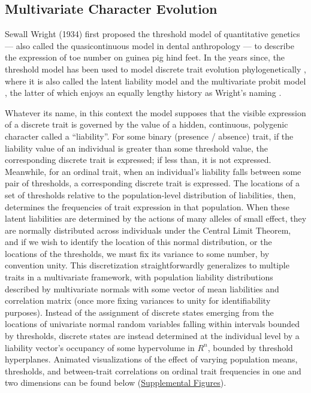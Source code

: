 \documentclass[10pt, twocolumn, twoside]{article}
\begin{document}
\subsection{Multivariate Character Evolution}

Sewall Wright (1934) first proposed the threshold model of quantitative genetics --- also called the quasicontinuous model \citep{grunebergGeneticalStudiesSkeleton1955} in dental anthropology --- to describe the expression of toe number on guinea pig hind feet. In the years since, the threshold model has been used to model discrete trait evolution phylogenetically \citep{felsensteinUsingQuantitativeGenetic2005, felsensteinComparativeMethodBoth2012, revellAncestralCharacterEstimation2014a}, where it is also called the latent liability model \citep{cybisAssessingPhenotypicCorrelation2015} and the multivariate probit model \citep{zhangLargescaleInferenceCorrelation2019}, the latter of which enjoys an equally lengthy history as Wright's naming \citep{blissMethodProbits1934, chibAnalysisMultivariateProbit1998}. 

Whatever its name, in this context the model supposes that the visible expression of a discrete trait is governed by the value of a hidden, continuous, polygenic character called a “liability”. For some binary (presence / absence) trait, if the liability value of an individual is greater than some threshold value, the corresponding discrete trait is expressed; if less than, it is not expressed. Meanwhile, for an ordinal trait, when an individual's liability falls between some pair of thresholds, a corresponding discrete trait is expressed. The locations of a set of thresholds relative to the population-level distribution of liabilities, then, determines the frequencies of trait expression in that population. When these latent liabilities are determined by the actions of many alleles of small effect, they are normally distributed across individuals under the Central Limit Theorem, and if we wish to identify the location of this normal distribution, or the locations of the thresholds, we must fix its variance to some number, by convention unity. This discretization straightforwardly generalizes to multiple traits in a multivariate framework, with population liability distributions described by multivariate normals with some vector of mean liabilities and correlation matrix (once more fixing variances to unity for identifiability purposes). Instead of the assignment of discrete states emerging from the locations of univariate normal random variables falling within intervals bounded by thresholds, discrete states are instead determined at the individual level by a liability vector's occupancy of some hypervolume in $R^n$, bounded by threshold hyperplanes. Animated visualizations of the effect of varying population means, thresholds, and between-trait correlations on ordinal trait frequencies in one and two dimensions can be found below (\hyperref[supp:SupplementalFiguresThresholdModel]{Supplemental Figures}).
\end{document}
